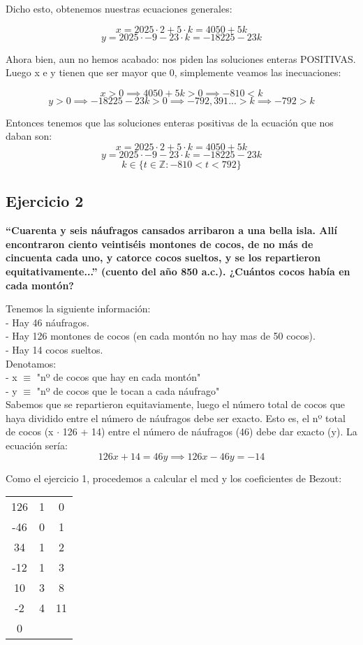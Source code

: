 \documentclass[11pt, a4paper, titlepage]{article}
\begin{document}
Dicho esto, obtenemos nuestras ecuaciones generales:

$$ x = 2025 \cdot 2 + 5 \cdot k = 4050 + 5k $$
$$ y = 2025 \cdot -9 - 23 \cdot k = -18225 - 23k $$

Ahora bien, aun no hemos acabado: nos piden las soluciones enteras POSITIVAS. Luego x e y tienen que ser mayor que 0, simplemente veamos las inecuaciones:

$$ x > 0 \implies 4050 + 5k > 0 \implies -810 < k$$
$$ y > 0 \implies -18225 - 23k > 0 \implies -792,391... > k \implies -792 > k $$

Entonces tenemos que las soluciones enteras positivas de la ecuación que nos daban son:
$$ x = 2025 \cdot 2 + 5 \cdot k = 4050 + 5k $$
$$ y = 2025 \cdot -9 - 23 \cdot k = -18225 - 23k $$
$$ k \in \{ t \in \mathbb{Z} : -810 < t < 792 \} $$

\subsection{\LARGE{Ejercicio 2}}

\textbf{“Cuarenta y seis náufragos cansados arribaron a una bella isla. Allí
encontraron ciento veintiséis montones de cocos, de no más de cincuenta cada uno,
y catorce cocos sueltos, y se los repartieron equitativamente...” (cuento del año
850 a.c.). ¿Cuántos cocos había en cada montón?}

Tenemos la siguiente información: \\
- Hay 46 náufragos. \\
- Hay 126 montones de cocos (en cada montón no hay mas de 50 cocos). \\
- Hay 14 cocos sueltos. \\

Denotamos: \\
- x $\equiv$ "nº de cocos que hay en cada montón" \\
- y $\equiv$ "nº de cocos que le tocan a cada náufrago" \\

Sabemos que se repartieron equitaviamente, luego el número total de cocos que haya dividido entre el número de náufragos debe ser exacto. Esto es, el nº total de cocos (x $\cdot$ 126 + 14) entre el número de náufragos (46) debe dar exacto (y). La ecuación sería:
$$ 126x + 14 = 46y \implies 126x - 46y = -14 $$

Como el ejercicio 1, procedemos a calcular el mcd y los coeficientes de Bezout:

\begin{center}
\begin{tabular}{c|cc}
126 & 1 & 0 \\
-46 & 0 & 1 \\
\hline
34 & 1 & 2 \\
\hline
-12 & 1 & 3 \\
\hline
10 & 3 & 8 \\
\hline
-2 & 4 & 11 \\
\hline
0
\end{tabular}
\end{center}
\end{document}
